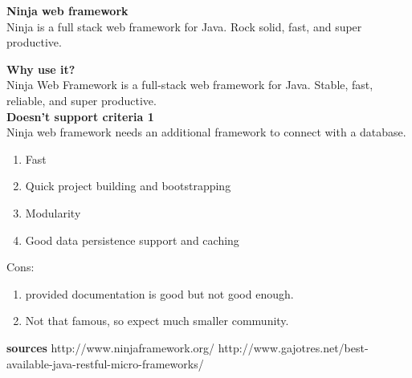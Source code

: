 \textbf{Ninja web framework} \\
Ninja is a full stack web framework for Java.
Rock solid, fast, and super productive.

\textbf{Why use it?} \\
Ninja Web Framework is a full-stack web framework for Java. Stable, fast, reliable, and super productive. \\

\textbf{Doesn't support criteria 1}\\
Ninja web framework needs an additional framework  to connect with a database.

\begin{enumerate}
	\item Fast
	\item Quick project building and bootstrapping
	\item Modularity
	\item Good data persistence support and caching
\end{enumerate}
Cons:
\begin{enumerate}
	\item provided documentation is good but not good enough.
	\item Not that famous, so expect much smaller community.
\end{enumerate}

\textbf{sources}
http://www.ninjaframework.org/
http://www.gajotres.net/best-available-java-restful-micro-frameworks/